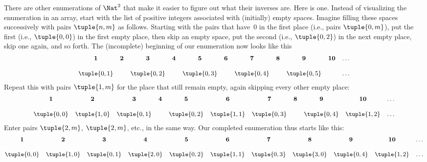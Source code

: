 \documentclass[../../../include/open-logic-section]{subfiles}
\begin{document}

\begin{explain}
There are other enumerations of $\Nat^2$ that make it easier to
figure out what their inverses are. Here is one. Instead of
visualizing the enumeration in an array, start with the list of
positive integers associated with (initially) empty spaces. Imagine
filling these spaces successively with pairs $\tuple{n,m}$ as follows.
Starting with the pairs that have~$0$ in  the first place (i.e., pairs
$\tuple{0,m}$), put the first (i.e., $\tuple{0,0}$) in the first empty
place, then skip an empty space, put the second (i.e., $\tuple{0,2}$)
in the next empty place, skip one again, and so forth. The
(incomplete) beginning of our enumeration now looks like this
\[\small
\begin{array}{@{}c c c c c c c c c c c@{}}
\mathbf 1 & \mathbf 2 & \mathbf 3 & \mathbf 4 & \mathbf 5 & \mathbf 6 & \mathbf 7 & \mathbf 8 & \mathbf 9 & \mathbf{10} & \dots \\ \\
\tuple{0,1} &  & \tuple{0,2} &  & \tuple{0,3} & & \tuple{0,4} &  & \tuple{0,5} &  & \dots \\
\end{array}
\]
Repeat this with pairs $\tuple{1,m}$ for the place that still remain
empty, again skipping every other empty place:
\[\small
\begin{array}{@{}c c c c c c c c c c c@{}}
\mathbf 1 & \mathbf 2 & \mathbf 3 & \mathbf 4 & \mathbf 5 & \mathbf 6 & \mathbf 7 & \mathbf 8 & \mathbf 9 & \mathbf{10} & \dots \\ \\
\tuple{0,0} & \tuple{1,0} & \tuple{0,1} &  & \tuple{0,2} & \tuple{1,1} & 
\tuple{0,3} & & \tuple{0,4} &  \tuple{1,2} & \dots \\
\end{array}
\]
Enter pairs $\tuple{2,m}$, $\tuple{2,m}$, etc., in the same way. Our
completed enumeration thus starts like this:
\[\small
\begin{array}{@{}cc c c c c c c c c c@{}}
\mathbf 1 & \mathbf 2 & \mathbf 3 & \mathbf 4 & \mathbf 5 & \mathbf 6 & \mathbf 7 & \mathbf 8 & \mathbf 9 & \mathbf{10} & \dots \\ \\
\tuple{0,0} & \tuple{1,0} & \tuple{0,1} & \tuple{2,0}  & \tuple{0,2} & 
\tuple{1,1} & \tuple{0,3} & \tuple{3,0}  & \tuple{0,4} &  \tuple{1,2} & \dots \\
\end{array}
\]
\end{explain}
\end{document}
